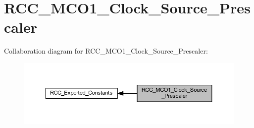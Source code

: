 \hypertarget{group___r_c_c___m_c_o1___clock___source___prescaler}{}\section{R\+C\+C\+\_\+\+M\+C\+O1\+\_\+\+Clock\+\_\+\+Source\+\_\+\+Prescaler}
\label{group___r_c_c___m_c_o1___clock___source___prescaler}
Collaboration diagram for R\+C\+C\+\_\+\+M\+C\+O1\+\_\+\+Clock\+\_\+\+Source\+\_\+\+Prescaler\+:\nopagebreak
\begin{figure}[H]
\begin{center}
\leavevmode
\includegraphics[width=350pt]{group___r_c_c___m_c_o1___clock___source___prescaler}
\end{center}
\end{figure}
